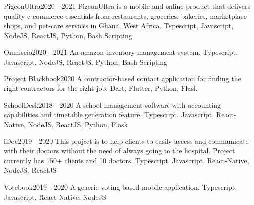 %
%
%


\begin{projects}

	\project
	{PigeonUltra}{2020 - 2021}
	{     }
	{PigeonUltra is a mobile and online product that delivers quality e-commerce essentials from restaurants, groceries, bakeries, marketplace shops, and pet-care services in Ghana, West Africa.}
	{Typescript, Javascript, NodeJS, ReactJS, Python, Bash Scripting}

	\project
	{Omniscio}{2020 - 2021}
	{}
	{An amazon inventory management system.}
	{Typescript, Javascript, NodeJS, ReactJS, Python, Bash Scripting}

	\project
	{Project Blackbook}{2020}
	{}
	{A contractor-based contact application for finding the right contractors for the right job.}
	{Dart, Flutter, Python, Flask}
	
	\project
	{SchoolDesk}{2018 - 2020}
	{}
	{A school management software with accounting capabilities and timetable generation feature.}
	{Typescript, Javascript, React-Native, NodeJS, ReactJS, Python, Flask}
	
	\project
	{iDoc}{2019 - 2020}
	{ }
	{This project is to help clients to easily access and communicate with their doctors without the need of always going to the hospital. Project currently has 150+ clients and 10 doctors.}
	{Typescript, Javascript, React-Native, NodeJS, ReactJS}
				
	\project
	{Votebook}{2019 - 2020}
	{}
	{A generic voting based mobile application.}
	{Typescript, Javascript, React-Native, NodeJS}
	

\end{projects}
